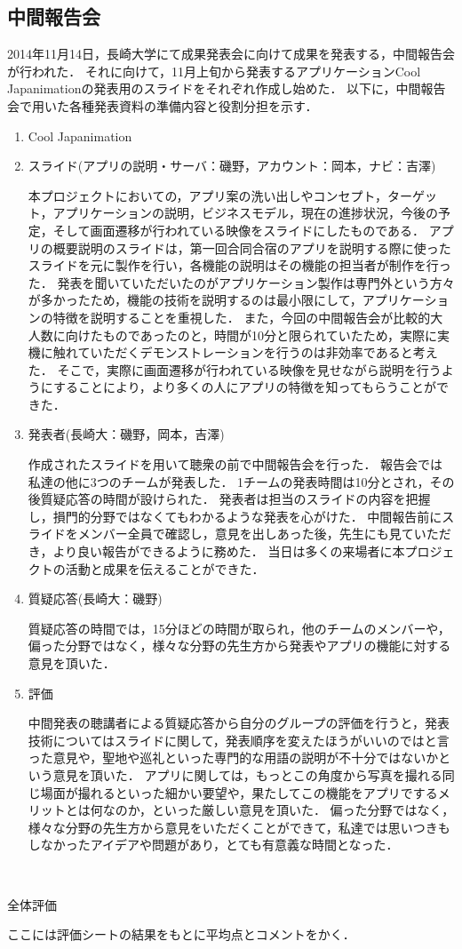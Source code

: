 \subsection{中間報告会}
\par
2014年11月14日，長崎大学にて成果発表会に向けて成果を発表する，中間報告会が行われた．
それに向けて，11月上旬から発表するアプリケーションCool Japanimationの発表用のスライドをそれぞれ作成し始めた．
以下に，中間報告会で用いた各種発表資料の準備内容と役割分担を示す．
\begin{enumerate}
\item Cool Japanimation　
\par
\item スライド(アプリの説明・サーバ：磯野，アカウント：岡本，ナビ：吉澤) 
\par
本プロジェクトにおいての，アプリ案の洗い出しやコンセプト，ターゲット，アプリケーションの説明，ビジネスモデル，現在の進捗状況，今後の予定，そして画面遷移が行われている映像をスライドにしたものである．
アプリの概要説明のスライドは，第一回合同合宿のアプリを説明する際に使ったスライドを元に製作を行い，各機能の説明はその機能の担当者が制作を行った．
発表を聞いていただいたのがアプリケーション製作は専門外という方々が多かったため，機能の技術を説明するのは最小限にして，アプリケーションの特徴を説明することを重視した．
また，今回の中間報告会が比較的大人数に向けたものであったのと，時間が10分と限られていたため，実際に実機に触れていただくデモンストレーションを行うのは非効率であると考えた．
そこで，実際に画面遷移が行われている映像を見せながら説明を行うようにすることにより，より多くの人にアプリの特徴を知ってもらうことができた．
\item 発表者(長崎大：磯野，岡本，吉澤)
\par
作成されたスライドを用いて聴衆の前で中間報告会を行った．
報告会では私達の他に3つのチームが発表した．
1チームの発表時間は10分とされ，その後質疑応答の時間が設けられた．
発表者は担当のスライドの内容を把握し，損門的分野ではなくてもわかるような発表を心がけた．
中間報告前にスライドをメンバー全員で確認し，意見を出しあった後，先生にも見ていただき，より良い報告ができるように務めた．
当日は多くの来場者に本プロジェクトの活動と成果を伝えることができた． 
\item 質疑応答(長崎大：磯野) 
\par
質疑応答の時間では，15分ほどの時間が取られ，他のチームのメンバーや，偏った分野ではなく，様々な分野の先生方から発表やアプリの機能に対する意見を頂いた． 
\item 評価 
\par
中間発表の聴講者による質疑応答から自分のグループの評価を行うと，発表技術についてはスライドに関して，発表順序を変えたほうがいいのではと言った意見や，聖地や巡礼といった専門的な用語の説明が不十分ではないかという意見を頂いた．
アプリに関しては，もっとこの角度から写真を撮れる同じ場面が撮れるといった細かい要望や，果たしてこの機能をアプリでするメリットとは何なのか，といった厳しい意見を頂いた．
偏った分野ではなく，様々な分野の先生方から意見をいただくことができて，私達では思いつきもしなかったアイデアや問題があり，とても有意義な時間となった．
\end{enumerate}　
\par
全体評価
\par
ここには評価シートの結果をもとに平均点とコメントをかく．
